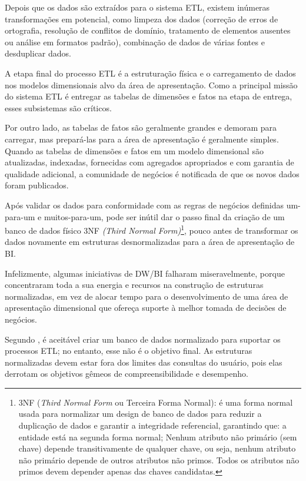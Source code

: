 Depois que os dados s\~{a}o extra\'{i}dos para o sistema ETL, existem inúmeras transforma\c{c}\~{o}es em potencial, como limpeza dos dados (corre\c{c}\~{a}o de erros de ortografia, resolu\c{c}\~{a}o de conflitos de dom\'{i}nio, tratamento de elementos ausentes ou an\'{a}lise em formatos padr\~{a}o), combina\c{c}\~{a}o de dados de v\'{a}rias fontes e desduplicar dados. 

A etapa final do processo ETL \'{e} a estrutura\c{c}\~{a}o f\'{i}sica e o carregamento de dados nos modelos dimensionais alvo da \'{a}rea de apresenta\c{c}\~{a}o. Como a principal miss\~{a}o do sistema ETL \'{e} entregar as tabelas de dimens\~{o}es e fatos na etapa de entrega, esses subsistemas s\~{a}o cr\'{i}ticos.

Por outro lado, as tabelas de fatos s\~{a}o geralmente grandes e demoram para carregar, mas prepar\'{a}-las para a \'{a}rea de apresenta\c{c}\~{a}o \'{e} geralmente simples. 
Quando as tabelas de dimens\~{o}es e fatos em um modelo dimensional s\~{a}o atualizadas, indexadas, fornecidas com agregados apropriados e com garantia de qualidade adicional, a comunidade de neg\'{o}cios \'{e} notificada de que os novos dados foram publicados.

Ap\'{o}s validar os dados para conformidade com as regras de neg\'{o}cios definidas um-para-um e muitos-para-um, pode ser inútil dar o passo final da cria\c{c}\~{a}o de um banco de dados f\'{i}sico 3NF \textit{(Third Normal Form)}\footnote{3NF (\textit{Third Normal Form} ou Terceira Forma Normal): \'{e} uma forma normal usada para normalizar um design de banco de dados para reduzir a duplica\c{c}\~{a}o de dados e garantir a integridade referencial, garantindo que: a entidade est\'{a} na segunda forma normal; Nenhum atributo n\~{a}o prim\'{a}rio (sem chave) depende transitivamente de qualquer chave, ou seja, nenhum atributo n\~{a}o prim\'{a}rio depende de outros atributos n\~{a}o primos. Todos os atributos n\~{a}o primos devem depender apenas das chaves candidatas.}, pouco antes de transformar os dados novamente em estruturas desnormalizadas para a \'{a}rea de apresenta\c{c}\~{a}o de BI.

Infelizmente, algumas iniciativas de DW/BI falharam miseravelmente, porque concentraram toda a sua energia e recursos na constru\c{c}\~{a}o de estruturas normalizadas, em vez de alocar tempo para o desenvolvimento de uma \'{a}rea de apresenta\c{c}\~{a}o dimensional que ofere\c{c}a suporte \`{a} melhor tomada de decis\~{o}es de neg\'{o}cios. 

Segundo \cite{dw-kimball-2013}, \'{e} aceit\'{a}vel criar um banco de dados normalizado para suportar os processos ETL; no entanto, esse n\~{a}o \'{e} o objetivo final. As estruturas normalizadas devem estar fora dos limites das consultas do usu\'{a}rio, pois elas derrotam os objetivos g\^{e}meos de compreensibilidade e desempenho. 

